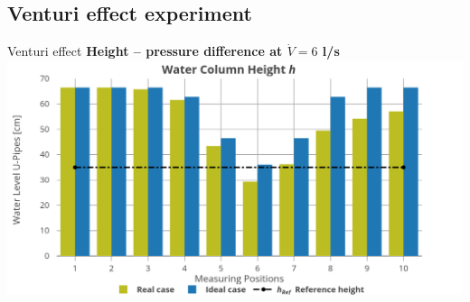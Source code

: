 \documentclass{article}
\begin{document}
\newpage
\begin{multicols}{2}
\setlength{\columnsep}{1pt}

\subsection{Venturi effect experiment}
\begin{examplebox}{Venturi effect}
    \textbf{Height -- pressure difference at $\dot{V} = 6$ l/s}\\[1ex]
    \includegraphics[width=\textwidth]{media/venturi.png}


\end{examplebox}
\end{multicols}
\end{document}
